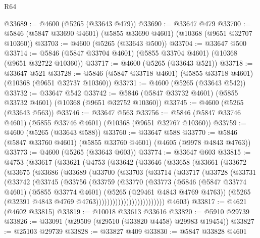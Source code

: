 \begin{lexlean}{R64}
\begin{coremodule}
@33689 := @4600 (@5265 (@33643 @479))
@33690 := @33647 @479
@33700 := @5846 (@5847 @33690 @4601) (@5855 @33690 @4601) (@10368 (@9651 @32707 @10360))
@33703 := @4600 (@5265 (@33643 @500))
@33704 := @33647 @500
@33714 := @5846 (@5847 @33704 @4601) (@5855 @33704 @4601) (@10368 (@9651 @32722 @10360))
@33717 := @4600 (@5265 (@33643 @521))
@33718 := @33647 @521
@33728 := @5846 (@5847 @33718 @4601) (@5855 @33718 @4601) (@10368 (@9651 @32737 @10360))
@33731 := @4600 (@5265 (@33643 @542))
@33732 := @33647 @542
@33742 := @5846 (@5847 @33732 @4601) (@5855 @33732 @4601) (@10368 (@9651 @32752 @10360))
@33745 := @4600 (@5265 (@33643 @563))
@33746 := @33647 @563
@33756 := @5846 (@5847 @33746 @4601) (@5855 @33746 @4601) (@10368 (@9651 @32767 @10360))
@33759 := @4600 (@5265 (@33643 @588))
@33760 := @33647 @588
@33770 := @5846 (@5847 @33760 @4601) (@5855 @33760 @4601) (@4605 (@9978 @4843 @4763))
@33773 := @4600 (@5265 (@33643 @603))
@33774 := @33647 @603
@33815 := @4753
    (@33617
      (@33621
        (@4753
          (@33642
            (@33646
              (@33658
                (@33661
                  (@33672
                    (@33675
                      (@33686
                        (@33689
                          (@33700
                            (@33703
                              (@33714
                                (@33717
                                  (@33728
                                    (@33731
                                      (@33742
                                        (@33745
                                          (@33756
                                            (@33759
                                              (@33770
                                                (@33773
                                                  (@5846
                                                    (@5847 @33774 @4601)
                                                    (@5855 @33774 @4601)
                                                    (@5265 (@29461 @4843 @4769 @4763))
                                                    (@5265
                                                      (@32391
                                                        @4843
                                                        @4769
                                                        @4763)))))))))))))))))))))))))
      @4603)
@33817 := @4621 (@4602 @33815)
@33819 := @10018 @33613 @33616
@33820 := @5910 @29739
@33826 := @33091 (@29509 (@29510 (@33820 @4458) @29983 @19454))
@33827 := @25103 @29739
@33828 := @33827 @409
@33830 := @5847 @33828 @4601

\end{coremodule}
\end{lexlean}
